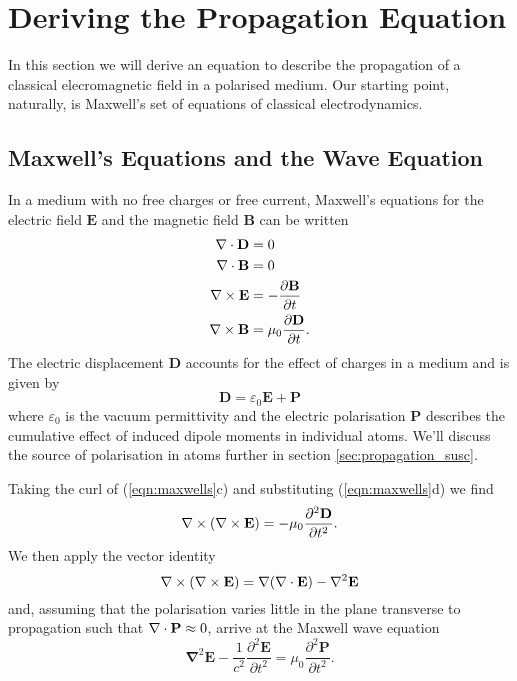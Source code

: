 \section{Deriving the Propagation Equation}
  \label{sec:propagation_deriving}

    In this section we will derive an equation to describe the propagation of a
    classical elecromagnetic field in a polarised medium. Our starting point,
    naturally, is Maxwell's set of equations of classical electrodynamics.

  \subsection{Maxwell's Equations and the Wave Equation}

    In a medium with no free charges or free current, Maxwell's equations for
    the electric field $\mathbf{E}$ and the magnetic field $\mathbf{B}$ can be
    written\cite{jackson1998classical}
    \begin{subequations}
      \begin{align}
        \nabla \cdot \mathbf{D} &= 0 \\
        \nabla \cdot \mathbf{B} &= 0 \\
        \nabla \times \mathbf{E} &= -\frac{\partial \mathbf{B}}{\partial t} \\
        \nabla \times \mathbf{B} &= \mu_0 \frac{\partial \mathbf{D}}{\partial t}.
      \end{align}
      \label{eqn:maxwells}
    \end{subequations}
    The electric displacement $\mathbf{D}$ accounts for the effect of charges in
    a medium and is given by 
    \begin{equation}\label{eqn:elec_displacement}
      \mathbf{D} = \varepsilon_0 \mathbf{E} + \mathbf{P}
    \end{equation}
    where $\varepsilon_0$ is the vacuum permittivity and the electric
    polarisation $\mathbf{P}$ describes the cumulative effect of induced dipole
    moments in individual atoms. We'll discuss the source of polarisation in
    atoms further in section \ref{sec:propagation_susc}.

    Taking the curl of (\ref{eqn:maxwells}c) and substituting 
    (\ref{eqn:maxwells}d) we find 
    $$
      \nabla \times (\nabla \times \mathbf{E}) = 
      -\mu_0 \frac{\partial^2 \mathbf{D}}{\partial t^2}.
    $$
    We then apply the vector identity
    $$
      \nabla \times (\nabla \times \mathbf{E}) = 
        \nabla(\nabla \cdot \mathbf{E}) - \nabla^2 \mathbf{E}
    $$
    and, assuming that the polarisation varies little in the plane transverse to
    propagation such that $\nabla \cdot \mathbf{P} \approx 0$, arrive at the Maxwell
    wave equation
    \begin{equation}
      \mathbf{\nabla}^2 \mathbf{E} - \frac{1}{c^2} 
      \frac{\partial^2\mathbf{E}}{\partial t^2} = 
      \mu_0 \frac{\partial^2\mathbf{P}}{\partial t^2}.
    \label{eqn:mwe}
    \end{equation}

